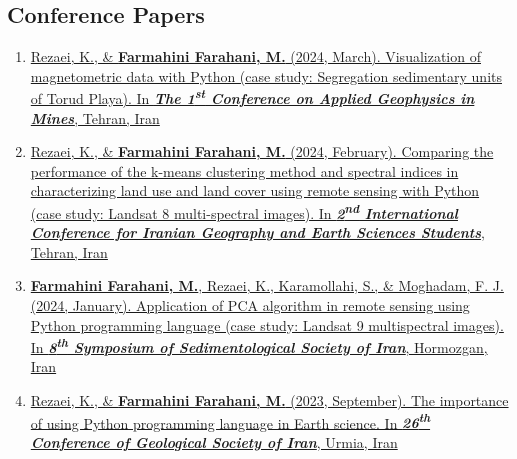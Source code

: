 \documentclass[letterpaper,11pt]{article}
\begin{document}
\begin{justify}
	\subsection*{Conference Papers}
	\begin{enumerate}[label=\arabic*.,left=0pt,topsep=7.5pt,partopsep=0pt,itemsep=3.5pt,parsep=0pt]
		\item \href{https://www.researchgate.net/publication/378739800_Visualization_of_magnetometric_data_with_Python_case_study_Segregation_sedimentary_units_of_Torud_Playa}{Rezaei, K., \& \textbf{Farmahini Farahani, M.} (2024, March). Visualization of magnetometric data with Python (case study: Segregation sedimentary units of Torud Playa). In \textit{\textbf{The 1\textsuperscript{st} Conference on Applied Geophysics in Mines}}, Tehran, Iran}
		\item \href{https://www.researchgate.net/publication/378307658_Comparing_the_performance_of_the_k-means_clustering_method_and_spectral_indices_in_characterizing_land_use_and_land_cover_using_remote_sensing_with_Python_case_study_Landsat_8_multi-spectral_images}{Rezaei, K., \& \textbf{Farmahini Farahani, M.} (2024, February). Comparing the performance of the k-means clustering method and spectral indices in characterizing land use and land cover using remote sensing with Python (case study: Landsat 8 multi-spectral images). In \textit{\textbf{2\textsuperscript{nd} International Conference for Iranian Geography and Earth Sciences Students}}, Tehran, Iran} 
		\item \href{https://www.researchgate.net/publication/377838524_Application_of_PCA_algorithm_in_remote_sensing_using_Python_programming_language_case_study_Landsat_9_multispectral_images}{\textbf{Farmahini Farahani, M.}, Rezaei, K., Karamollahi, S., \& Moghadam, F. J. (2024, January). Application of PCA algorithm in remote sensing using Python programming language (case study: Landsat 9 multispectral images). In \textit{\textbf{8\textsuperscript{th} Symposium of Sedimentological Society of Iran}}, Hormozgan, Iran}
		\item \href{https://www.researchgate.net/publication/374914382_The_importance_of_using_Python_programming_language_in_Earth_science}{Rezaei, K., \& \textbf{Farmahini Farahani, M.} (2023, September). The importance of using Python programming language in Earth science. In \textit{\textbf{26\textsuperscript{th} Conference of Geological Society of Iran}}, Urmia, Iran}
	\end{enumerate}
	

\end{justify}
\end{document}
